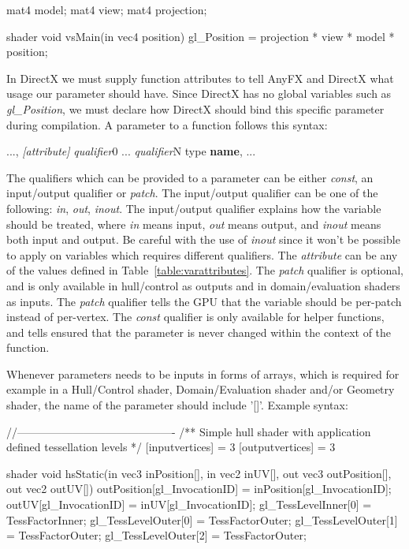 \documentclass{article}
\newcommand{\SyntaxBox}[1]
{	
	\begin{center}
	\colorbox{orange!60}
	{
		\begin{minipage}{\linewidth}
		\hfill
		\begin{tabbing}
		#1
		\end{tabbing}
		\end{minipage}
	}
	\end{center}
}
\begin{document}
\begin{CodeBox}
mat4 model;
mat4 view;
mat4 projection;

shader
void
vsMain(in vec4 position)
{
	gl_Position = projection * view * model * position;
}
\end{CodeBox}

In DirectX we must supply function attributes to tell AnyFX and DirectX what usage our parameter should have. Since DirectX has no global variables such as \textit{gl\_Position}, we must declare how DirectX should bind this specific parameter during compilation. A parameter to a function follows this syntax:

\SyntaxBox
{
	...,  \textit{[attribute]} \textit{qualifier}0 ... \textit{qualifier}N type \textbf{name}, ...
}

The qualifiers which can be provided to a parameter can be either \textit{const}, an input/output qualifier or \textit{patch}. The input/output qualifier can be one of the following: \textit{in}, \textit{out}, \textit{inout}. The input/output qualifier explains how the variable should be treated, where \textit{in} means input, \textit{out} means output, and \textit{inout} means both input and output. Be careful with the use of \textit{inout} since it won't be possible to apply on variables which requires different qualifiers. The \textit{attribute} can be any of the values defined in Table~\ref{table:varattributes}. The \textit{patch} qualifier is optional, and is only available in hull/control as outputs and in domain/evaluation shaders as inputs. The \textit{patch} qualifier tells the GPU that the variable should be per-patch instead of per-vertex. The \textit{const} qualifier is only available for helper functions, and tells ensured that the parameter is never changed within the context of the function.

Whenever parameters needs to be inputs in forms of arrays, which is required for example in a Hull/Control shader, Domain/Evaluation shader and/or Geometry shader, the name of the parameter should include '[]'. Example syntax:

\begin{CodeBox}
//-------------------------------------------
/**
	Simple hull shader with application defined tessellation levels
*/
[inputvertices] = 3
[outputvertices] = 3

shader
void
hsStatic(in vec3 inPosition[], in vec2 inUV[], out vec3 outPosition[], out vec2 outUV[])
{
	outPosition[gl_InvocationID] = inPosition[gl_InvocationID];
	outUV[gl_InvocationID] = inUV[gl_InvocationID];
	gl_TessLevelInner[0] = TessFactorInner;
	gl_TessLevelOuter[0] = TessFactorOuter;
	gl_TessLevelOuter[1] = TessFactorOuter;
	gl_TessLevelOuter[2] = TessFactorOuter;
}
\end{CodeBox}
\end{document}
